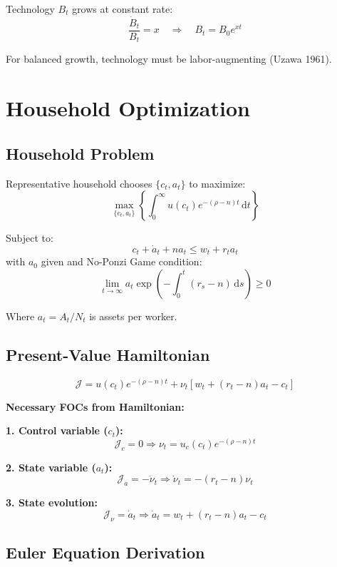 \documentclass[a4paper,11pt]{article}
\newcommand{\diff}{\mathrm{d}}
\begin{document}
Technology $B_t$ grows at constant rate:
\[
\frac{\dot{B}_t}{B_t} = x \quad \Rightarrow \quad B_t = B_0 e^{xt}
\]

For balanced growth, technology must be labor-augmenting (Uzawa 1961).

\section{Household Optimization}

\subsection*{Household Problem}
Representative household chooses $\{c_t, a_t\}$ to maximize:
\[
\max_{\{c_t, a_t\}} \left\{ \int_0^\infty u(c_t) e^{-(\rho-n)t} \, \diff t \right\}
\]

Subject to:
\[
c_t + \dot{a}_t + n a_t \leq w_t + r_t a_t
\]
with $a_0$ given and No-Ponzi Game condition:
\[
\lim_{t \to \infty} a_t \exp\left(-\int_0^t (r_s - n) \, \diff s\right) \geq 0
\]

Where $a_t = A_t/N_t$ is assets per worker.

\subsection*{Present-Value Hamiltonian}
\[
\mathcal{J} = u(c_t) e^{-(\rho-n)t} + \nu_t \left[ w_t + (r_t - n)a_t - c_t \right]
\]

\begin{derivationbox}
\textbf{Necessary FOCs from Hamiltonian:}

\textbf{1. Control variable ($c_t$):}
\[
\mathcal{J}_{c} = 0 \Rightarrow \nu_t = u_c(c_t) e^{-(\rho-n)t}
\tag{FOC-C}
\]

\textbf{2. State variable ($a_t$):}
\[
\mathcal{J}_{a} = -\dot{\nu}_t \Rightarrow \dot{\nu}_t = -(r_t - n)\nu_t
\tag{FOC-A}
\]

\textbf{3. State evolution:}
\[
\mathcal{J}_{\nu} = \dot{a}_t \Rightarrow \dot{a}_t = w_t + (r_t - n)a_t - c_t
\tag{State}
\]
\end{derivationbox}

\subsection*{Euler Equation Derivation}
\end{document}
